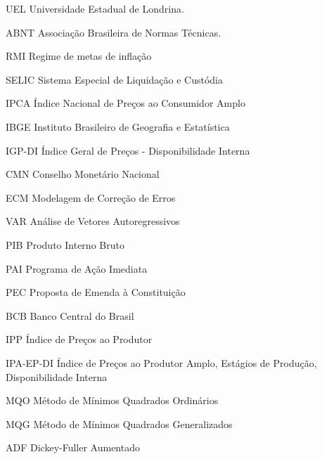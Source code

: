 \documentclass[12pt,oneside,a4paper,chapter=TITLE,english,brazil,sumario=abnt-6027-2012]{abntex2}
\begin{document}
\listoftables*
\cleardoublepage


\begin{siglas}
	\item[UEL] Universidade Estadual de Londrina. 
	\item[ABNT] Associação Brasileira de Normas Técnicas.
	\item[RMI] Regime de metas de inflação
	\item[SELIC] Sistema Especial de Liquidação e Custódia
	\item[IPCA] Índice Nacional de Preços ao Consumidor Amplo
	\item[IBGE] Instituto Brasileiro de Geografia e Estatística
	\item[IGP-DI] Índice Geral de Preços - Disponibilidade Interna
	\item[CMN] Conselho Monetário Nacional
	\item[ECM] Modelagem de Correção de Erros
	\item[VAR] Análise de Vetores Autoregressivos
	\item[PIB] Produto Interno Bruto
	\item[PAI] Programa de Ação Imediata
	\item[PEC] Proposta de Emenda à Constituição
	\item[BCB] Banco Central do Brasil
	\item[IPP] Índice de Preços ao Produtor
	\item[IPA-EP-DI] Índice de Preços ao Produtor Amplo, Estágios de Produção, Disponibilidade Interna
	\item[MQO] Método de Mínimos Quadrados Ordinários
	\item[MQG] Método de Mínimos Quadrados Generalizados
	\item[ADF] Dickey-Fuller Aumentado
\end{siglas}
\pagebreak




\tableofcontents*
\cleardoublepage


\textual %
\pagestyle{simple}
\end{document}
